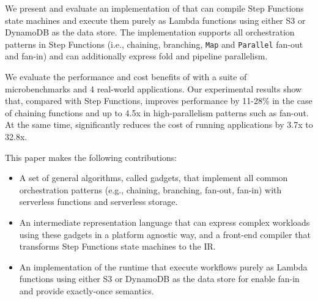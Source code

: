 
We present and evaluate an implementation of \name{} that can compile Step
Functions state machines and execute them purely as Lambda functions using
either S3 or DynamoDB as the data store. The implementation supports all
orchestration patterns in Step Functions (i.e., chaining, branching,
\texttt{Map} and \texttt{Parallel} fan-out and fan-in) and can additionally
express fold and pipeline parallelism.

We evaluate the performance and cost benefits of \name{} with a suite of
microbenchmarks and 4 real-world applications. Our experimental results show
that, compared with Step Functions, \name{} improves performance by 11-28\% in
the case of chaining functions and up to 4.5x in high-parallelism patterns
such as fan-out. At the same time, \name{} significantly reduces the cost of
running applications by 3.7x to 32.8x.

This paper makes the following contributions:

\begin{itemize}

  \item A set of general algorithms, called gadgets, that implement all common
  orchestration patterns (e.g., chaining, branching, fan-out, fan-in) with
  serverless functions and serverless storage.

  \item An intermediate representation language that can express complex
  workloads using these gadgets in a platform agnostic way, and a front-end
  compiler that transforms Step Functions state machines to the IR.

  \item An implementation of the \name{} runtime that execute workflows purely
  as Lambda functions using either S3 or DynamoDB as the data store for enable
  fan-in and provide exactly-once semantics.

\end{itemize}

